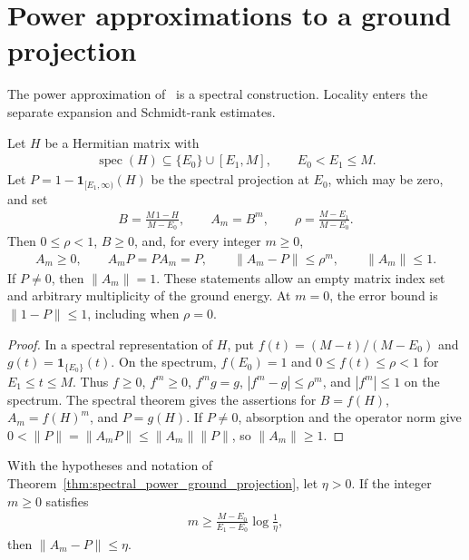 \section{Power approximations to a ground projection}
\label{sec:spectral_power_projection}

The power approximation of~\cite{Landau2013PolynomialTime} is a spectral
construction. Locality enters the separate expansion and Schmidt-rank
estimates.

\begin{theorem}
    \label{thm:spectral_power_ground_projection}
    \leanok
    Let $H$ be a Hermitian matrix with
    \begin{align}
        \operatorname{spec}(H)\subseteq\{E_0\}\cup[E_1,M],
        \qquad E_0<E_1\le M.
    \end{align}
    Let $P=1-\boldsymbol{1}_{[E_1,\infty)}(H)$ be the spectral projection
    at $E_0$, which may be zero, and set
    \begin{align}
        B=\frac{M\,1-H}{M-E_0},\qquad
        A_m=B^m,\qquad
        \rho=\frac{M-E_1}{M-E_0}.
    \end{align}
    Then $0\le\rho<1$, $B\ge0$, and, for every integer $m\ge0$,
    \begin{align}
        A_m\ge0,\qquad A_mP=PA_m=P,\qquad
        \|A_m-P\|\le\rho^m,\qquad \|A_m\|\le1.
    \end{align}
    If $P\ne0$, then $\|A_m\|=1$. These statements allow an empty
    matrix index set and arbitrary multiplicity of the ground energy.
    At $m=0$, the error bound is $\|1-P\|\le1$, including when $\rho=0$.
\end{theorem}

\begin{proof}
    \leanok
    In a spectral representation of $H$, put
    $f(t)=(M-t)/(M-E_0)$ and $g(t)=\boldsymbol{1}_{\{E_0\}}(t)$.
    On the spectrum, $f(E_0)=1$ and $0\le f(t)\le\rho<1$ for
    $E_1\le t\le M$. Thus $f\ge0$, $f^m\ge0$, $f^mg=g$,
    $|f^m-g|\le\rho^m$, and $|f^m|\le1$ on the spectrum.
    The spectral theorem gives the assertions for $B=f(H)$,
    $A_m=f(H)^m$, and $P=g(H)$. If $P\ne0$, absorption and the
    operator norm give
    $0<\|P\|=\|A_mP\|\le\|A_m\|\|P\|$, so $\|A_m\|\ge1$.
\end{proof}

\begin{corollary}
    \label{cor:spectral_power_log_threshold}
    \leanok
    With the hypotheses and notation of
    Theorem~\ref{thm:spectral_power_ground_projection}, let $\eta>0$.
    If the integer $m\ge0$ satisfies
    \begin{align}
        m\ge\frac{M-E_0}{E_1-E_0}\log\frac1\eta,
    \end{align}
    then $\|A_m-P\|\le\eta$.
\end{corollary}

